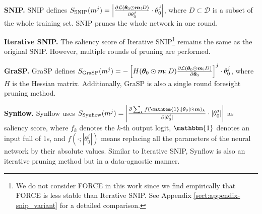 \documentclass{article} %
\begin{document}
\textbf{SNIP.} SNIP \citep{snip} defines $S_{\text{SNIP}}(m^j)=\left|\frac{\partial \mathcal{L}(\boldsymbol{\theta}_0 \odot \boldsymbol{m}; D)}{\partial \theta_0^j} \cdot \theta_0^j\right|$, where $D \subset \mathcal{D}$ is a subset of the whole training set. SNIP prunes the whole network in one round.

\textbf{Iterative SNIP.} The saliency score of Iterative SNIP\footnote{We do not consider FORCE in this work since we find empirically that FORCE is less stable than Iterative SNIP. See Appendix \ref{sect:appendix-snip_variant} for a detailed comparison.} \citep{force} remains the same as the original SNIP. However, multiple rounds of pruning are performed. 

\textbf{GraSP.} GraSP \citep{grasp} defines $S_{\text{GraSP}}(m^j)=-\left[H(\boldsymbol{\theta}_0 \odot \boldsymbol{m}; D)\frac{\partial \mathcal{L}(\boldsymbol{\theta}_0  \odot \boldsymbol{m}; D)}{\partial \boldsymbol{\theta}_0}\right]^j \cdot \theta_0^j$, where $H$ is the Hessian matrix. Additionally, GraSP is also a single round foresight pruning method.

\textbf{Synflow.} Synflow \citep{synflow} uses $S_{\text{Synflow}}(m^j)=\left|\frac{\partial \sum_k f(\mathbbm{1};{|\boldsymbol{\theta}_0| \odot \boldsymbol{m}})_k}{\partial |\theta_0^j|} \cdot |\theta_0^j|\right|$ as saliency score, where $f_k$ denotes the $k$-th output logit, $\mathbbm{1}$ denotes an input full of $1$s, and $f(\cdot;|\theta_0^j|)$ means replacing all the parameters of the neural network by their absolute values. Similar to Iterative SNIP, Synflow is also an iterative pruning method but in a data-agnostic manner.
\end{document}
